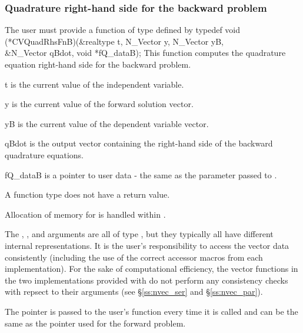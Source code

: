 \subsubsection{Quadrature right-hand side for the backward problem}
The user must provide a function of type  defined by
{
  typedef void (*CVQuadRhsFnB)(&realtype t, N\_Vector y, N\_Vector yB, \\
                               &N\_Vector qBdot, void *fQ\_dataB);
}
{
  This function computes the quadrature equation right-hand side for the
  backward problem.
}
{
  \begin{args}[fQ\_dataB]
  \item[t]
    is the current value of the independent variable.
  \item[y]
    is the current value of the forward solution vector.
  \item[yB]
    is the current value of the dependent variable vector.
  \item[qBdot]
    is the output vector containing the right-hand side of the backward quadrature
    equations.
  \item[fQ\_dataB]
    is a pointer to user data - the same as the       
    parameter passed to .   
  \end{args}
}
{
  A  function type does not have a return value.                        
}
{
  Allocation of memory for  is handled within {\cvodes}.

  The , , and  arguments are all of type ,
  but they  typically all have different internal representations. It is the user's 
  responsibility to access the vector data consistently (including the use of the 
  correct accessor macros from each {\nvector} implementation). For the sake of 
  computational efficiency, the vector functions in the two {\nvector} implementations 
  provided with {\cvodes} do not perform any consistency checks with repsect to their 
   arguments (see \S\ref{ss:nvec_ser} and \S\ref{ss:nvec_par}).

  The  pointer is passed to the user's  function every time 
  it is called and can be the same as the  pointer used for the forward problem.
}

